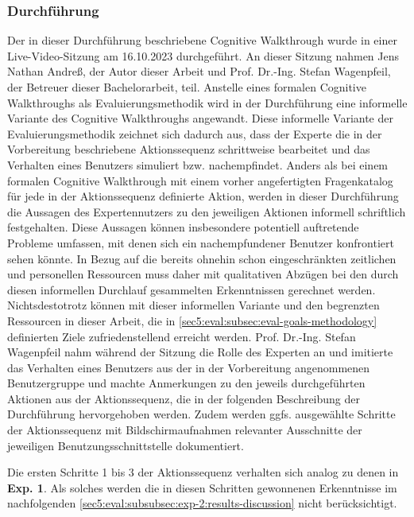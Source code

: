 \subsubsection{Durchführung}
\label{sec5:eval:subsubsec:exp-2:execution}
Der in dieser Durchführung beschriebene Cognitive Walkthrough wurde in einer Live-Video-Sitzung am 16.10.2023 durchgeführt.
An dieser Sitzung nahmen Jens Nathan Andreß, der Autor dieser Arbeit und Prof. Dr.-Ing. Stefan Wagenpfeil, der Betreuer dieser Bachelorarbeit, teil.
Anstelle eines formalen Cognitive Walkthroughs als Evaluierungsmethodik wird in der Durchführung eine informelle Variante des Cognitive Walkthroughs angewandt.
Diese informelle Variante der Evaluierungsmethodik zeichnet sich dadurch aus, dass der Experte die in der Vorbereitung beschriebene Aktionssequenz schrittweise bearbeitet und das Verhalten eines Benutzers simuliert bzw. nachempfindet.
Anders als bei einem formalen Cognitive Walkthrough mit einem vorher angefertigten Fragenkatalog für jede in der Aktionssequenz definierte Aktion, werden in dieser Durchführung die Aussagen des Expertennutzers zu den jeweiligen Aktionen informell schriftlich festgehalten.
Diese Aussagen können insbesondere potentiell auftretende Probleme umfassen, mit denen sich ein nachempfundener Benutzer konfrontiert sehen könnte.
In Bezug auf die bereits ohnehin schon eingeschränkten zeitlichen und personellen Ressourcen muss daher mit qualitativen Abzügen bei den durch diesen informellen Durchlauf gesammelten Erkenntnissen gerechnet werden.
Nichtsdestotrotz können mit dieser informellen Variante und den begrenzten Ressourcen in dieser Arbeit, die in \cref{sec5:eval:subsec:eval-goals-methodology} definierten Ziele zufriedenstellend erreicht werden.
Prof. Dr.-Ing. Stefan Wagenpfeil nahm während der Sitzung die Rolle des Experten an und imitierte das Verhalten eines Benutzers aus der in der Vorbereitung angenommenen Benutzergruppe und machte Anmerkungen zu den jeweils durchgeführten Aktionen aus der Aktionssequenz, die in der folgenden Beschreibung der Durchführung hervorgehoben werden.
Zudem werden ggfs. ausgewählte Schritte der Aktionssequenz mit Bildschirmaufnahmen relevanter Ausschnitte der jeweiligen Benutzungsschnittstelle dokumentiert.

Die ersten Schritte 1 bis 3 der Aktionssequenz verhalten sich analog zu denen in \textbf{Exp. 1}.
Als solches werden die in diesen Schritten gewonnenen Erkenntnisse im nachfolgenden \cref{sec5:eval:subsubsec:exp-2:results-discussion} nicht berücksichtigt.

